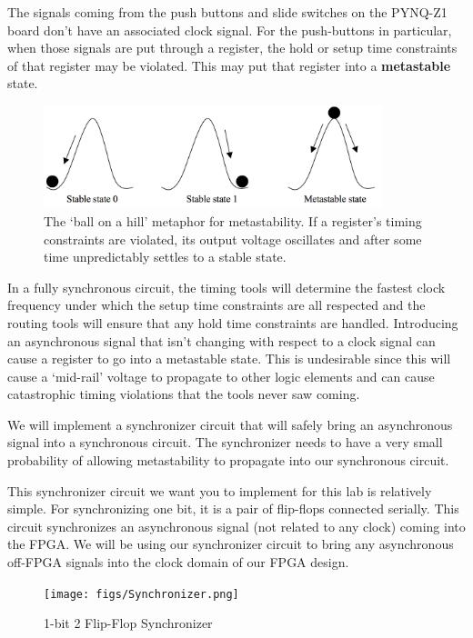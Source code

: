\documentclass[11pt]{article}
\begin{document}
The signals coming from the push buttons and slide switches on the PYNQ-Z1 board don't have an associated clock signal. For the push-buttons in particular, when those signals are put through a register, the hold or setup time constraints of that register may be violated. This may put that register into a \textbf{metastable} state.

\begin{figure}[H]
	\centerline{\includegraphics[height=3cm]{figs/lab2_fig3.png}}
	\caption{The `ball on a hill' metaphor for metastability. If a register's timing constraints are violated, its output voltage oscillates and after some time unpredictably settles to a stable state.}
\end{figure}

In a fully synchronous circuit, the timing tools will determine the fastest clock frequency under which the setup time constraints are all respected and the routing tools will ensure that any hold time constraints are handled. Introducing an asynchronous signal that isn't changing with respect to a clock signal can cause a register to go into a metastable state. This is undesirable since this will cause a `mid-rail' voltage to propagate to other logic elements and can cause catastrophic timing violations that the tools never saw coming.

We will implement a synchronizer circuit that will safely bring an asynchronous signal into a synchronous circuit. The synchronizer needs to have a very small probability of allowing metastability to propagate into our synchronous circuit.

This synchronizer circuit we want you to implement for this lab is relatively simple. For synchronizing one bit, it is a pair of flip-flops connected serially. This circuit synchronizes an asynchronous signal (not related to any clock) coming into the FPGA. We will be using our synchronizer circuit to bring any asynchronous off-FPGA signals into the clock domain of our FPGA design.

\begin{figure}[H]
	\vspace{0.5cm}
	\centerline{\texttt{[image: figs/Synchronizer.png]}}
	\caption{1-bit 2 Flip-Flop Synchronizer}
\end{figure}
\end{document}
